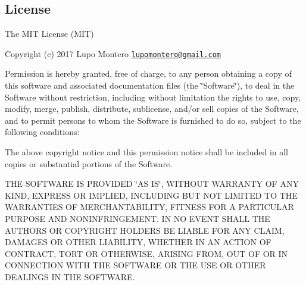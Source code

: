 \subsection*{License}

The M\+IT License (M\+IT)

Copyright (c) 2017 Lupo Montero \href{mailto:lupomontero@gmail.com}{\tt lupomontero@gmail.\+com}

Permission is hereby granted, free of charge, to any person obtaining a copy of this software and associated documentation files (the \char`\"{}\+Software\char`\"{}), to deal in the Software without restriction, including without limitation the rights to use, copy, modify, merge, publish, distribute, sublicense, and/or sell copies of the Software, and to permit persons to whom the Software is furnished to do so, subject to the following conditions\+:

The above copyright notice and this permission notice shall be included in all copies or substantial portions of the Software.

T\+HE S\+O\+F\+T\+W\+A\+RE IS P\+R\+O\+V\+I\+D\+ED \char`\"{}\+A\+S I\+S\char`\"{}, W\+I\+T\+H\+O\+UT W\+A\+R\+R\+A\+N\+TY OF A\+NY K\+I\+ND, E\+X\+P\+R\+E\+SS OR I\+M\+P\+L\+I\+ED, I\+N\+C\+L\+U\+D\+I\+NG B\+UT N\+OT L\+I\+M\+I\+T\+ED TO T\+HE W\+A\+R\+R\+A\+N\+T\+I\+ES OF M\+E\+R\+C\+H\+A\+N\+T\+A\+B\+I\+L\+I\+TY, F\+I\+T\+N\+E\+SS F\+OR A P\+A\+R\+T\+I\+C\+U\+L\+AR P\+U\+R\+P\+O\+SE A\+ND N\+O\+N\+I\+N\+F\+R\+I\+N\+G\+E\+M\+E\+NT. IN NO E\+V\+E\+NT S\+H\+A\+LL T\+HE A\+U\+T\+H\+O\+RS OR C\+O\+P\+Y\+R\+I\+G\+HT H\+O\+L\+D\+E\+RS BE L\+I\+A\+B\+LE F\+OR A\+NY C\+L\+A\+IM, D\+A\+M\+A\+G\+ES OR O\+T\+H\+ER L\+I\+A\+B\+I\+L\+I\+TY, W\+H\+E\+T\+H\+ER IN AN A\+C\+T\+I\+ON OF C\+O\+N\+T\+R\+A\+CT, T\+O\+RT OR O\+T\+H\+E\+R\+W\+I\+SE, A\+R\+I\+S\+I\+NG F\+R\+OM, O\+UT OF OR IN C\+O\+N\+N\+E\+C\+T\+I\+ON W\+I\+TH T\+HE S\+O\+F\+T\+W\+A\+RE OR T\+HE U\+SE OR O\+T\+H\+ER D\+E\+A\+L\+I\+N\+GS IN T\+HE S\+O\+F\+T\+W\+A\+RE. 